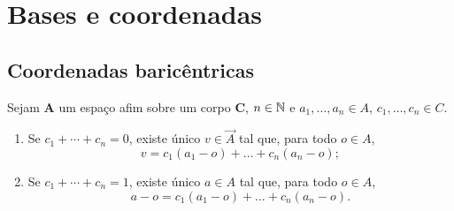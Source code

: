 \section{Bases e coordenadas}

\subsection{Coordenadas baricêntricas}

\begin{proposition}
Sejam $\bm A$ um espaço afim sobre um corpo $\bm C$, $n \in \mathbb{N}$ e $a_1,\ldots,a_n \in A$, $c_1,\ldots,c_n \in C$.
	\begin{enumerate}
		\item Se $c_1+\cdots+c_n = 0$, existe único $v \in \vec{A}$ tal que, para todo $o \in A$,
			\begin{equation*}
				v = c_1(a_1-o) + \ldots + c_n(a_n-o);
			\end{equation*}
		\item Se $c_1+\cdots+c_n = 1$, existe único $a \in A$ tal que, para todo $o \in A$,
			\begin{equation*}
				a-o = c_1(a_1-o) + \ldots + c_n(a_n-o).
			\end{equation*}
	\end{enumerate}
\end{proposition}
